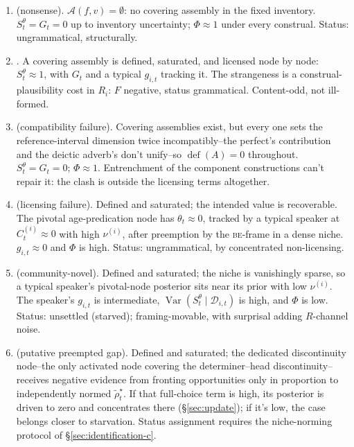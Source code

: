 \begin{enumerate}
\item {} (nonsense).
  $\mathcal{A}(f,v)=\emptyset$: no covering assembly in the fixed inventory.
  $S_t^{\theta}=G_t=0$ up to inventory uncertainty; $\Phi\approx1$ under every
  construal. Status: ungrammatical, structurally.

\item {}. A covering assembly is defined, saturated, and licensed node by node: $S_t^\theta\approx1$, with $G_t$ and a typical $g_{i,t}$ tracking it. The strangeness is a construal-plausibility cost in $R_i$: $F$ negative, status grammatical. Content-odd, not ill-formed.

\item {} (compatibility failure). Covering assemblies exist, but every one sets the reference-interval dimension twice incompatibly--the perfect's contribution and the deictic adverb's don't unify--so $\operatorname{def}(A)=0$ throughout. $S_t^{\theta}=G_t=0$; $\Phi\approx1$. Entrenchment of the component constructions can't repair it: the clash is outside the licensing terms altogether.

\item {} (licensing failure). Defined and saturated; the intended value is recoverable. The pivotal age-predication node has $\theta_t\approx0$, tracked by a typical speaker at $C^{(i)}_t\approx0$ with high $\nu^{(i)}$, after preemption by the \textsc{be}-frame in a dense niche. $g_{i,t}\approx0$ and $\Phi$ is high. Status: ungrammatical, by concentrated non-licensing.

\item {} (community-novel). Defined and saturated; the niche is vanishingly sparse, so a typical speaker's pivotal-node posterior sits near its prior with low $\nu^{(i)}$. The speaker's $g_{i,t}$ is intermediate, $\operatorname{Var}(S_t^{\theta}\mid\mathcal{D}_{i,t})$ is high, and $\Phi$ is low. Status: unsettled (starved); framing-movable, with surprisal adding $R$-channel noise.

\item {} (putative preempted gap).
Defined and saturated; the dedicated discontinuity node--the only activated node
covering the determiner--head discontinuity--receives negative evidence from
fronting opportunities only in proportion to independently normed
$\widetilde{\rho}_t^\star$. If that full-choice term is high, its posterior is
driven to zero and concentrates there (\S\ref{sec:update}); if it's low, the
case belongs closer to starvation. Status assignment requires the niche-norming
protocol of \S\ref{sec:identification-c}.


\end{enumerate}
